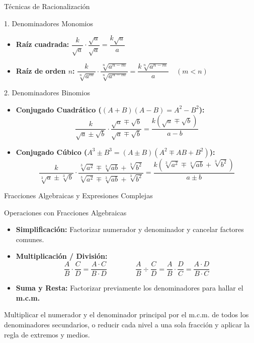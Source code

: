\documentclass[aspectratio=169]{beamer}
\begin{document}
\begin{frame}{Técnicas de Racionalización}
  \begin{block}{1. Denominadores Monomios}
    \begin{itemize}
      \item \textbf{Raíz cuadrada:} $\dfrac{k}{\sqrt{a}} \cdot \dfrac{\sqrt{a}}{\sqrt{a}} = \dfrac{k\sqrt{a}}{a}$
      \item \textbf{Raíz de orden $n$:} $\dfrac{k}{\sqrt[n]{a^m}} \cdot \dfrac{\sqrt[n]{a^{n-m}}}{\sqrt[n]{a^{n-m}}} = \dfrac{k\sqrt[n]{a^{n-m}}}{a} \quad (m < n)$
    \end{itemize}
  \end{block}

  \vspace{4pt}
  \begin{block}{2. Denominadores Binomios}
    \begin{itemize}
      \item \textbf{Conjugado Cuadrático ($(A+B)(A-B) = A^2 - B^2$):}
            $$\frac{k}{\sqrt{a} \pm \sqrt{b}} \cdot \frac{\sqrt{a} \mp \sqrt{b}}{\sqrt{a} \mp \sqrt{b}} = \frac{k(\sqrt{a} \mp \sqrt{b})}{a - b}$$
      \item \textbf{Conjugado Cúbico ($A^3 \pm B^3 = (A \pm B)(A^2 \mp AB + B^2)$):}
            $$\frac{k}{\sqrt[3]{a} \pm \sqrt[3]{b}} \cdot \frac{\sqrt[3]{a^2} \mp \sqrt[3]{ab} + \sqrt[3]{b^2}}{\sqrt[3]{a^2} \mp \sqrt[3]{ab} + \sqrt[3]{b^2}} = \frac{k(\sqrt[3]{a^2} \mp \sqrt[3]{ab} + \sqrt[3]{b^2})}{a \pm b}$$
    \end{itemize}
  \end{block}
\end{frame}

\begin{frame}{Fracciones Algebraicas y Expresiones Complejas}
  \begin{block}{Operaciones con Fracciones Algebraicas}
    \begin{itemize}
      \item \textbf{Simplificación:} Factorizar numerador y denominador y cancelar factores comunes.
      \item \textbf{Multiplicación / División:}
            $$\frac{A}{B} \cdot \frac{C}{D} = \frac{A \cdot C}{B \cdot D} \qquad\qquad \frac{A}{B} \div \frac{C}{D} = \frac{A}{B} \cdot \frac{D}{C} = \frac{A \cdot D}{B \cdot C}$$
      \item \textbf{Suma y Resta:} Factorizar previamente los denominadores para hallar el \textbf{m.c.m.}
    \end{itemize}
  \end{block}

  \vspace{4pt}
  \begin{mwpasos}
    Multiplicar el numerador y el denominador principal por el m.c.m. de todos los denominadores secundarios, o reducir cada nivel a una sola fracción y aplicar la regla de extremos y medios.
  \end{mwpasos}
\end{frame}
\end{document}
